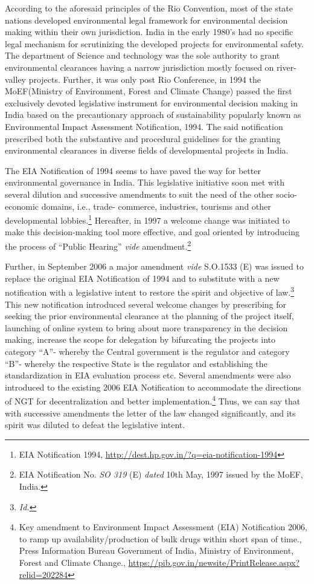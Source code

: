 \begin{multicols}{2}
\noi
According to the aforesaid principles of the Rio Convention, most of the state nations
developed environmental legal framework for environmental decision making within their
own jurisdiction. India in the early 1980’s had no specific legal mechanism for scrutinizing
the developed projects for environmental safety. The department of Science and technology
was the sole authority to grant environmental clearances having a narrow jurisdiction mostly
focused on river-valley projects. Further, it was only post Rio Conference, in 1994 the
MoEF(Ministry of Environment, Forest and Climate Change) passed the first exclusively
devoted legislative instrument for environmental decision making in India based on the
precautionary approach of sustainability popularly known as Environmental Impact
Assessment Notification, 1994. The said notification prescribed both the substantive and
procedural guidelines for the granting environmental clearances in diverse fields of
developmental projects in India. 



\noi
The EIA Notification of 1994 seems to have paved the way for better environmental
governance in India. This legislative initiative soon met with several dilution and successive
amendments to suit the need of the other socio-economic domains, i.e., trade- commerce,
industries, tourisms and other developmental lobbies.\footnote{EIA Notification 1994, \url{http://dest.hp.gov.in/?q=eia-notification-1994}} Hereafter, in 1997 a welcome change
was initiated to make this decision-making tool more effective, and goal oriented by
introducing the process of “Public Hearing” \textit{vide} amendment.\footnote{EIA Notification No. \textit{SO 319} (E) \textit{dated} 10th May, 1997 issued by the MoEF, India.}

\noi
Further, in September 2006 a major amendment \textit{vide} S.O.1533 (E) was issued to replace the
original EIA Notification of 1994 and to substitute with a new notification with a legislative
intent to restore the spirit and objective of law.\footnote{\textit{Id.}} This new notification introduced several
welcome changes by prescribing for seeking the prior environmental clearance at the
planning of the project itself, launching of online system to bring about more transparency in
the decision making, increase the scope for delegation by bifurcating the projects into
category “A”- whereby the Central government is the regulator and category “B”- whereby
the respective State is the regulator and establishing the standardization in EIA evaluation
process etc. Several amendments were also introduced to the existing 2006 EIA Notification
to accommodate the directions of NGT for decentralization and better implementation.\footnote{Key amendment to Environment Impact Assessment (EIA) Notification 2006, to ramp up
availability/production of bulk drugs within short span of time., Press Information Bureau
Government of India, Ministry of Environment, Forest and Climate Change.,
\url{https://pib.gov.in/newsite/PrintRelease.aspx?relid=202284}}
Thus, we can say that with successive amendments the letter of the law changed significantly,
and its spirit was diluted to defeat the legislative intent.



\end{multicols}
